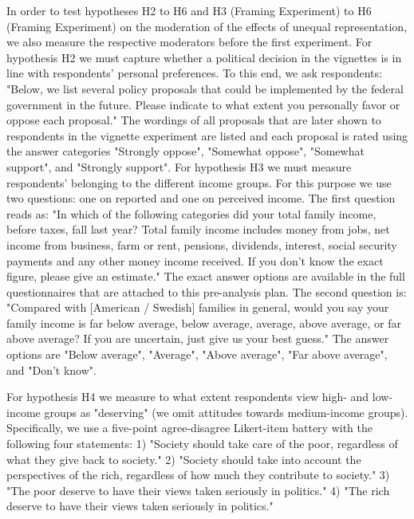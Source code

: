 \documentclass[12pt, letterpaper]{article}
\begin{document}
\begin{spacing}{1.5}
In order to test hypotheses H2 to H6 and H3 (Framing Experiment) to H6 (Framing Experiment) on the moderation of the effects of unequal representation, we also measure the respective moderators before the first experiment. For hypothesis H2 we must capture whether a political decision in the vignettes is in line with respondents' personal preferences. To this end, we ask respondents: "Below, we list several policy proposals that could be implemented by the federal government in the future. Please indicate to what extent you personally favor or oppose each proposal." The wordings of all proposals that are later shown to respondents in the vignette experiment are listed and each proposal is rated using the answer categories "Strongly oppose", "Somewhat oppose", "Somewhat support", and "Strongly support".
For hypothesis H3 we must measure respondents' belonging to the different income groups. For this purpose we use two questions: one on reported and one on perceived income. The first question reads as: "In which of the following categories did your total family income, before taxes, fall last year? Total family income includes money from jobs, net income from business, farm or rent, pensions, dividends, interest, social security payments and any other money income received. If you don't know the exact figure, please give an estimate." The exact answer options are available in the full questionnaires that are attached to this pre-analysis plan. The second question is: "Compared with [American / Swedish] families in general, would you say your family income is far below average, below average, average, above average, or far above average? If you are uncertain, just give us your best guess." The answer options are "Below average", "Average", "Above average", "Far above average", and "Don't know".

For hypothesis H4 we measure to what extent respondents view high- and low- income groups as "deserving" (we omit attitudes towards medium-income groups). Specifically, we use a five-point agree-disagree Likert-item battery with the following four statements: 1) "Society should take care of the poor, regardless of what they give back to society." 2) "Society should take into account the perspectives of the rich, regardless of how much they contribute to society." 3) "The poor deserve to have their views taken seriously in politics." 4) "The rich deserve to have their views taken seriously in politics."


\end{spacing}
\end{document}
